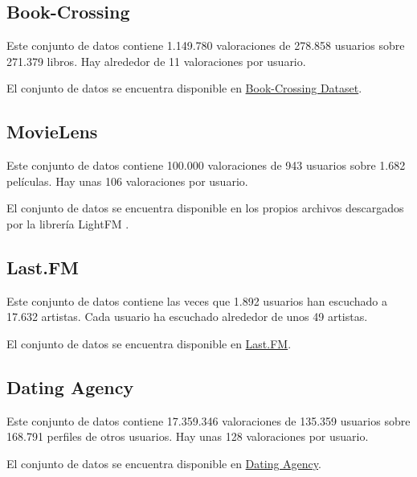 \subsection{Book-Crossing}\label{book-crossing}
Este conjunto de datos \cite{Ziegler2004} contiene 1.149.780 valoraciones de 278.858 usuarios sobre 271.379 libros. Hay alrededor de 11 valoraciones por usuario.

El conjunto de datos se encuentra disponible en \href{http://www2.informatik.uni-freiburg.de/~cziegler/BX/BX-CSV-Dump.zip}{Book-Crossing Dataset}.

\subsection{MovieLens}\label{movielens}
Este conjunto de datos \cite{GroupLens1998} contiene 100.000 valoraciones de 943 usuarios sobre 1.682 películas. Hay unas 106 valoraciones por usuario.

El conjunto de datos se encuentra disponible en los propios archivos descargados por la librería LightFM \cite{DBLP:conf/recsys/Kula15}.

\subsection{Last.FM}\label{last.fm}
Este conjunto de datos \cite{Cantador:RecSys2011} contiene las veces que 1.892 usuarios han escuchado a 17.632 artistas. Cada usuario ha escuchado alrededor de unos 49 artistas.

El conjunto de datos se encuentra disponible en \href{http://files.grouplens.org/datasets/hetrec2011/hetrec2011-lastfm-2k.zip}{Last.FM}.

\subsection{Dating Agency}\label{dating-agency}
Este conjunto de datos \cite{brozovsky07recommender} contiene 17.359.346 valoraciones de 135.359 usuarios sobre 168.791 perfiles de otros usuarios. Hay unas 128 valoraciones por usuario.

El conjunto de datos se encuentra disponible en \href{http://www.occamslab.com/petricek/data/libimseti-complete.zip}{Dating Agency}.
